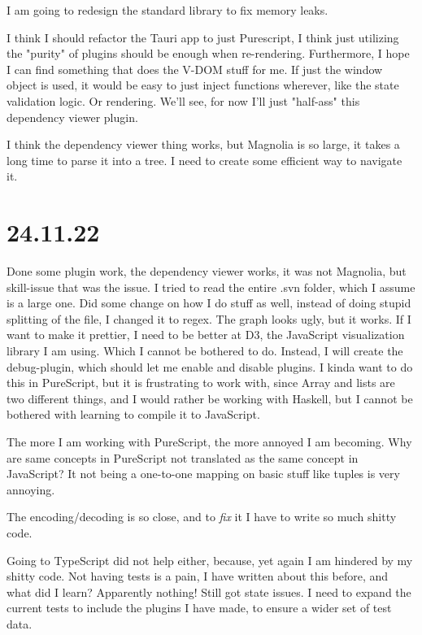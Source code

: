 I am going to redesign the standard library to fix memory leaks.

I think I should refactor the Tauri app to just Purescript, I think just
utilizing the "purity" of plugins should be enough when re-rendering.
Furthermore, I hope I can find something that does the V-DOM stuff for me. If
just the window object is used, it would be easy to just inject functions
wherever, like the state validation logic. Or rendering. We'll see, for now I'll
just "half-ass" this dependency viewer plugin.

I think the dependency viewer thing works, but Magnolia is so large, it takes a
long time to parse it into a tree. I need to create some efficient way to
navigate it.


\section{24.11.22}

Done some plugin work, the dependency viewer works, it was not Magnolia, but
skill-issue that was the issue. I tried to read the entire .svn folder, which
I assume is a large one. Did some change on how I do stuff as well, instead of
doing stupid splitting of the file, I changed it to regex. The graph looks
ugly, but it works. If I want to make it prettier, I need to be better at D3,
the JavaScript visualization library I am using. Which I cannot be bothered to
do. Instead, I will create the debug-plugin, which should let me enable and
disable plugins. I kinda want to do this in PureScript, but it is frustrating 
to work with, since Array and lists are two different things, and I would
rather be working with Haskell, but I cannot be bothered with learning to
compile it to JavaScript.

The more I am working with PureScript, the more annoyed I am becoming. Why are
same concepts in PureScript not translated as the same concept in JavaScript?
It not being a one-to-one mapping on basic stuff like tuples is very annoying.

The encoding/decoding is so close, and to \textit{fix} it I have to write so
much shitty code.

Going to TypeScript did not help either, because, yet again I am hindered by
my shitty code. Not having tests is a pain, I have written about this before,
and what did I learn? Apparently nothing!
Still got state issues. I need to expand the current tests to include the
plugins I have made, to ensure a wider set of test data.


